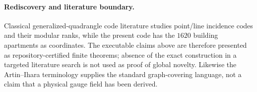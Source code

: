 \paragraph{Rediscovery and literature boundary.}
Classical generalized-quadrangle code literature studies point/line incidence
codes and their modular ranks, while the present code has the $1620$ building
apartments as coordinates.  The executable claims above are therefore presented
as repository-certified finite theorems; absence of the exact construction in a
targeted literature search is not used as proof of global novelty.  Likewise the
Artin--Ihara terminology supplies the standard graph-covering language, not a
claim that a physical gauge field has been derived.
